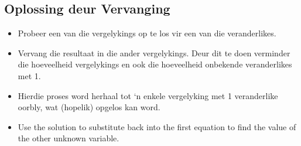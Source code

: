 \subsection*{Oplossing deur Vervanging}
\begin{itemize}
 \item Probeer een van die vergelykings op te los vir een van die veranderlikes.
\item Vervang die resultaat in die ander vergelykings. Deur dit te doen verminder die hoeveelheid
vergelykings en ook die hoeveelheid onbekende veranderlikes met 1.
\item Hierdie proses word herhaal tot ‘n enkele vergelyking met 1 veranderlike oorbly, wat (hopelik) opgelos kan word.
\item Use the solution to substitute back into the first equation to find the value of the other unknown variable.
\end{itemize}


